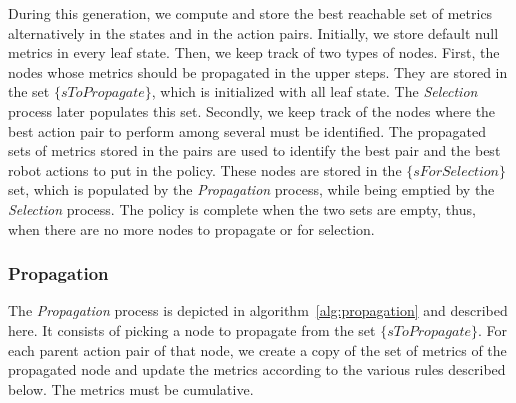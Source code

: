 During this generation, we compute and store the best reachable set of metrics alternatively in the states and in the action pairs. Initially, we store default null metrics in every leaf state. Then, we keep track of two types of nodes. First, the nodes whose metrics should be propagated in the upper steps. They are stored in the set $\{sToPropagate\}$, which is initialized with all leaf state. The \textit{Selection} process later populates this set. Secondly, we keep track of the nodes where the best action pair to perform among several must be identified. The propagated sets of metrics stored in the pairs are used to identify the best pair and the best robot actions to put in the policy. These nodes are stored in the $\{sForSelection\}$ set, which is populated by the \textit{Propagation} process, while being emptied by the \textit{Selection} process. The policy is complete when the two sets are empty, thus, when there are no more nodes to propagate or for selection.

    \subsubsection{Propagation}

The \textit{Propagation} process is depicted in algorithm~\ref{alg:propagation} and described here. It consists of picking a node to propagate from the set $\{sToPropagate\}$. For each parent action pair of that node, we create a copy of the set of metrics of the propagated node and update the metrics according to the various rules described below.
The metrics must be cumulative. 

